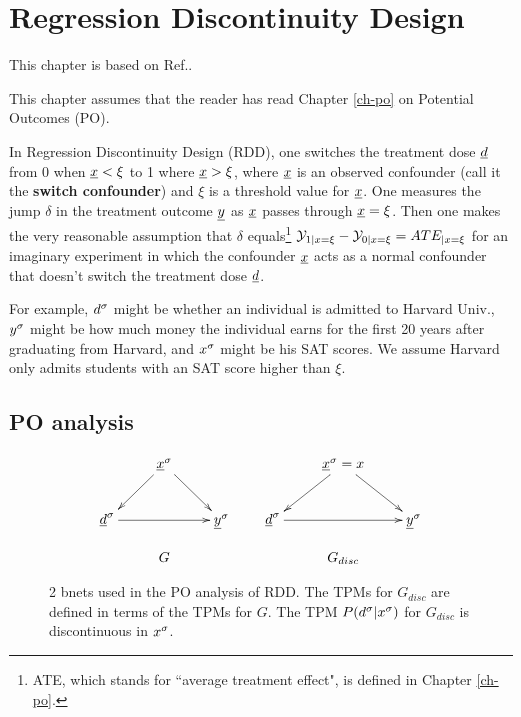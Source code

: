 \chapter{Regression Discontinuity Design}
\label{ch-reg-dis}

This chapter is based on
Ref.\cite{book-mixtape}.

This chapter assumes that the
reader has read Chapter \ref{ch-po}
on Potential Outcomes (PO).

In Regression Discontinuity Design (RDD),
one switches the treatment
dose ${\underline{d}}$ from 0 when ${\underline{x}}<\xi$ to 1 
where ${\underline{x}}>\xi$,  where  ${\underline{x}}$ is an
observed confounder (call
it the {\bf switch confounder})
and $\xi$ is a threshold value
for ${\underline{x}}$.
One measures the jump $\delta$
in the treatment outcome ${\underline{y}}$
as ${\underline{x}}$ passes through
${\underline{x}}=\xi$.
Then one makes the
very reasonable assumption
that $\delta$ equals\footnote{
ATE, which stands for 
``average treatment effect",
is defined
in Chapter \ref{ch-po}.} 
 ${\cal Y}_{1|x=\xi}-
{\cal Y}_{0|x=\xi}=ATE_{|x=\xi}$
for an imaginary experiment in which
the confounder ${\underline{x}}$
acts as a normal confounder
that doesn't switch 
 the treatment dose ${\underline{d}}$.

For example,
$d^\sigma$
might be whether
an individual is admitted
to Harvard Univ., $y^\sigma$
might be how much
money
the individual earns for the first 20 years
after graduating from
Harvard, and $x^\sigma$
might be his SAT scores.
We assume Harvard only admits 
students with
an SAT score higher
than $\xi$.



\section{PO analysis}

\begin{figure}[h!]
$$
\begin{array}{ccc}
\xymatrix{
&\rvx^\s\ar[dr]\ar[dl]
\\
\rvd^\s\ar[rr]&&\rvy^\s
}
&&
\xymatrix{
&\rvx^\s=x\ar[dr]\ar[dl]
\\
\rvd^\s\ar[rr]&&\rvy^\s
}
\\
\\
G&&G_{disc}
\end{array}
$$
\caption{
2 bnets used in the
PO analysis of RDD. The 
TPMs for $G_{disc}$
are  defined in terms of the TPMs for
$G$. The TPM 
$P(d^\sigma|x^\sigma)$ 
for $G_{disc}$
is discontinuous in $x^\sigma$.}
\label{fig-reg-dis-bnets}
\end{figure}

